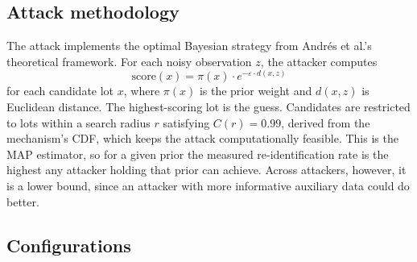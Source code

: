 \documentclass[11pt]{article}
\begin{document}
\subsection{Attack methodology}

The attack implements the optimal Bayesian strategy from Andr\'es et al.'s theoretical framework. For each noisy observation $z$, the attacker computes
\begin{equation}
\text{score}(x) = \pi(x) \cdot e^{-\varepsilon \cdot d(x, z)}
\end{equation}
for each candidate lot $x$, where $\pi(x)$ is the prior weight and $d(x, z)$ is Euclidean distance. The highest-scoring lot is the guess. Candidates are restricted to lots within a search radius $r$ satisfying $C(r) = 0.99$, derived from the mechanism's CDF, which keeps the attack computationally feasible. This is the MAP estimator, so for a given prior the measured re-identification rate is the highest any attacker holding that prior can achieve. Across attackers, however, it is a lower bound, since an attacker with more informative auxiliary data could do better.

\subsection{Configurations}
\end{document}
